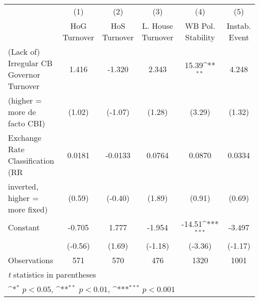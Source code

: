 \begin{table}[htbp]\centering
\def\sym#1{\ifmmode^{#1}\else\(^{#1}\)\fi}
\caption{\label{hiKfivs2}}
\begin{tabular}{l*{5}{c}}
\toprule
                                        &\multicolumn{1}{c}{(1)}&\multicolumn{1}{c}{(2)}&\multicolumn{1}{c}{(3)}&\multicolumn{1}{c}{(4)}&\multicolumn{1}{c}{(5)}\\
                                        &\multicolumn{1}{c}{HoG Turnover}&\multicolumn{1}{c}{HoS Turnover}&\multicolumn{1}{c}{L. House Turnover}&\multicolumn{1}{c}{WB Pol. Stability}&\multicolumn{1}{c}{Instab. Event}\\
\midrule
(Lack of) Irregular CB Governor Turnover&    1.416         &   -1.320         &    2.343         &    15.39\sym{**} &    4.248         \\
(higher = more de facto CBI)            &   (1.02)         &  (-1.07)         &   (1.28)         &   (3.29)         &   (1.32)         \\
\addlinespace
Exchange Rate Classification (RR        &   0.0181         &  -0.0133         &   0.0764         &   0.0870         &   0.0334         \\
inverted, higher = more fixed)          &   (0.59)         &  (-0.40)         &   (1.89)         &   (0.91)         &   (0.69)         \\
\addlinespace
Constant                                &   -0.705         &    1.777         &   -1.954         &   -14.51\sym{***}&   -3.497         \\
                                        &  (-0.56)         &   (1.69)         &  (-1.18)         &  (-3.36)         &  (-1.17)         \\
\midrule
Observations                            &      571         &      570         &      476         &     1320         &     1001         \\
\bottomrule
\multicolumn{6}{l}{\footnotesize \textit{t} statistics in parentheses}\\
\multicolumn{6}{l}{\footnotesize \sym{*} \(p<0.05\), \sym{**} \(p<0.01\), \sym{***} \(p<0.001\)}\\
\end{tabular}
\end{table}
